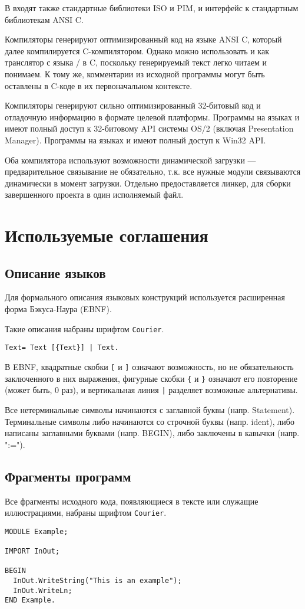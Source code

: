 В \xds{} входят также стандартные библиотеки ISO и PIM, и интерфейс
к стандартным библиотекам ANSI C.

\ifgenc

 Компиляторы \xds{} генерируют оптимизированный код на языке ANSI C,
 который далее компилируется C-компилятором. Однако \xds{} можно
 использовать и как транслятор с языка \mt/\ot{} в C, поскольку 
 генерируемый текст легко читаем и понимаем. К тому же, комментарии
 из исходной программы могут быть оставлены в C-коде в их первоначальном
 контексте. 

\fi
\ifgencode
   Компиляторы \xds{} генерируют сильно оптимизированный 32-битовый код и 
   отладочную информацию в формате целевой платформы.
 \ifosii
   Программы на языках \mt{} и \ot{}
   имеют полный доступ к 32-битовому API системы OS/2
   (включая Presentation Manager).
 \fi
 \ifwinnt
   Программы на языках \mt{} и \ot{}
   имеют полный доступ к Win32 API.
 \fi

\ifcomment
 Оба компилятора \xds{} используют возможности динамической загрузки ---
 предварительное связывание не обязательно, т.к. все нужные модули
 связываются динамически в момент загрузки. Отдельно предоставляется
 линкер, для сборки завершенного проекта в один исполняемый файл.
\fi

\fi %

\section{Используемые соглашения}

\subsection{Описание языков}

Для формального описания языковых конструкций используется
расширенная форма Бэкуса-Наура (EBNF).

Такие описания набраны шрифтом {\tt Courier}.

\begin{verbatim}
Text= Text [{Text}] | Text.
\end{verbatim}

В EBNF, квадратные скобки \verb+[+ и \verb+]+ 
означают возможность, но не обязательность заключенного в них выражения,
фигурные скобки \verb+{+ и \verb+}+ означают его повторение (может быть,
0 раз), и вертикальная линия \verb+|+ разделяет возможные альтернативы.

Все нетерминальные символы начинаются с заглавной буквы (напр. Statement).
Терминальные символы либо начинаются со строчной буквы (напр. ident), 
либо написаны заглавными буквами (напр. BEGIN), 
либо заключены в кавычки (напр. ":=").

\subsection{Фрагменты программ}

Все фрагменты исходного кода, появляющиеся в тексте или служащие 
иллюстрациями, набраны шрифтом {\tt Courier}.

\begin{verbatim}
MODULE Example;

IMPORT InOut;

BEGIN
  InOut.WriteString("This is an example");
  InOut.WriteLn;
END Example.
\end{verbatim}

